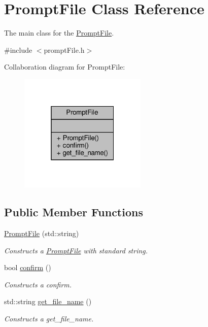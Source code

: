 \hypertarget{classPromptFile}{}\section{Prompt\+File Class Reference}
\label{classPromptFile}


The main class for the \hyperlink{classPromptFile}{Prompt\+File}.  




{\ttfamily \#include $<$prompt\+File.\+h$>$}



Collaboration diagram for Prompt\+File\+:\nopagebreak
\begin{figure}[H]
\begin{center}
\leavevmode
\includegraphics[width=172pt]{classPromptFile__coll__graph}
\end{center}
\end{figure}
\subsection*{Public Member Functions}
\begin{DoxyCompactItemize}
\item 
\hyperlink{classPromptFile_aba6c0006f00f3b69a96155e6ad8a34dd}{Prompt\+File} (std\+::string)
\begin{DoxyCompactList}\small\item\em Constructs a \hyperlink{classPromptFile}{Prompt\+File} with standard string. \end{DoxyCompactList}\item 
bool \hyperlink{classPromptFile_a9253bfa35b99abbf61cbd55212b7461b}{confirm} ()
\begin{DoxyCompactList}\small\item\em Constructs a confirm. \end{DoxyCompactList}\item 
std\+::string \hyperlink{classPromptFile_a69e3e7eab6eb5dcccd4e93285c0dbd34}{get\+\_\+file\+\_\+name} ()
\begin{DoxyCompactList}\small\item\em Constructs a get\+\_\+file\+\_\+name. \end{DoxyCompactList}\end{DoxyCompactItemize}


